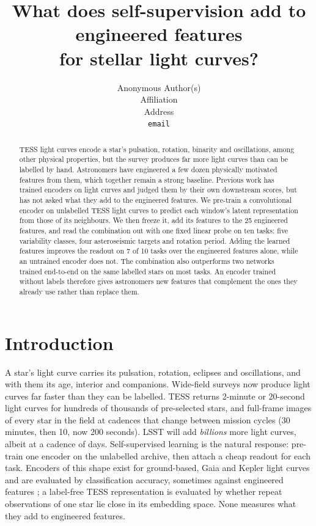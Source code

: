 \documentclass{article}
\title{What does self-supervision add to engineered features\\for stellar light curves?}
\author{Anonymous Author(s)\\Affiliation\\Address\\\texttt{email}}
\begin{document}
\maketitle

\begin{abstract}
TESS light curves encode a star's pulsation, rotation, binarity and oscillations, among other physical
properties, but the survey
produces far more light curves than can be labelled by hand. Astronomers have engineered a few
dozen physically motivated features from them, which together remain a strong baseline. Previous work has trained
encoders on light curves and judged them by their own downstream scores, but has not asked what
they add to the engineered features. We pre-train a convolutional encoder on unlabelled TESS light curves to predict each
window's latent representation from those of its neighbours. We then freeze it, add its features to
the 25 engineered features, and read the combination out with one fixed linear probe on ten tasks:
five variability classes, four asteroseismic targets and rotation period. Adding the learned features
improves the readout on 7 of 10 tasks over the engineered features alone, while an untrained encoder
does not. The combination also outperforms two networks trained end-to-end on the same labelled
stars on most tasks. An encoder trained without labels therefore gives astronomers new features
that complement the ones they already use rather than replace them.
\end{abstract}

\section{Introduction}

A star's light curve carries its pulsation, rotation, eclipses and oscillations, and with them its
age, interior and companions. Wide-field surveys now produce light curves far faster
than they can be labelled. TESS
\citep{ricker2015} returns 2-minute or 20-second \citep{huber2022} light curves for hundreds of
thousands of pre-selected stars, and full-frame images of every star in the field at cadences that
change between mission cycles (30 minutes, then 10, now 200 seconds). LSST \citep{ivezic2019}
will add \emph{billions} more light curves, albeit at a cadence of days. Self-supervised learning is the
natural response: pre-train one encoder on the unlabelled archive, then attach a cheap readout for
each task. Encoders of this shape exist for ground-based, Gaia and Kepler light curves
\citep{donoso2025astromer2,zuo2025falco,rui2026jepa} and are evaluated by classification accuracy,
sometimes against engineered features \citep{rui2026jepa}; a label-free TESS representation
\citep{poznanski2026} is evaluated by whether repeat observations of one star lie close in its embedding space.
None measures what they add to engineered features.
\end{document}
